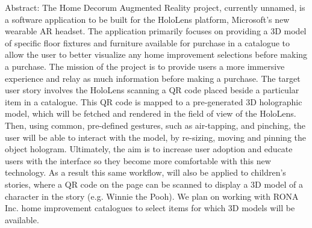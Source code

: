 Abstract:
	The Home Decorum Augmented Reality project, currently unnamed, is a software application to be built for the
HoloLens platform, Microsoft's new wearable AR headset. The application primarily focuses on providing a 3D model
of specific floor fixtures and furniture available for purchase in a catalogue to allow the user to better visualize
any home improvement selections before making a purchase. The mission of the project is to provide users a more
immersive experience and relay as much information before making a purchase. The target user story involves the HoloLens
scanning a QR code placed beside a particular item in a catalogue. This QR code is mapped to a pre-generated 3D holographic 
model, which will be fetched and rendered in the field of view of the HoloLens. Then, using common, pre-defined gestures,
such as air-tapping, and pinching, the user will be able to interact with the model, by re-sizing, moving and pinning the
object hologram. Ultimately, the aim is to increase user adoption and educate users with the interface so they become
more comfortable with this new technology. As a result this same workflow, will also be applied to children's stories, 
where a QR code on the page can be scanned to display a 3D model of a character in the story (e.g. Winnie the Pooh).
We plan on working with RONA Inc. home improvement catalogues to select items for which 3D models will be available.
